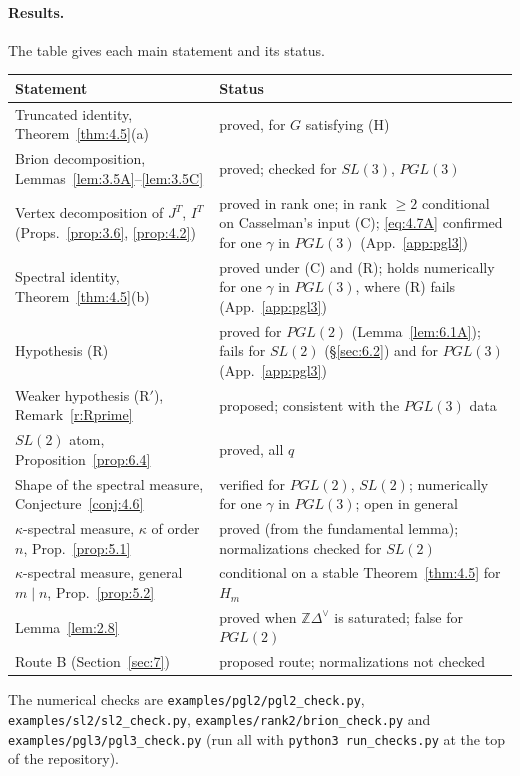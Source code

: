 \documentclass[12pt,letterpaper]{article}
\numberwithin{equation}{section}
\theoremstyle{plain}
\theoremstyle{remark}
\theoremstyle{plain}
\theoremstyle{definition}
\theoremstyle{remark}
\theoremstyle{remark}
\begin{document}
\paragraph{Results.} The table gives each main statement and its status.
\begin{center}
\begin{tabular}{p{}p{}}
\toprule
Statement & Status\\
\midrule
Truncated identity, Theorem~\ref{thm:4.5}(a) & proved, for $G$ satisfying (H)\\
Brion decomposition, Lemmas~\ref{lem:3.5A}--\ref{lem:3.5C} & proved; checked for $SL(3)$, $PGL(3)$\\
Vertex decomposition of $J^T$, $I^T$ (Props.~\ref{prop:3.6}, \ref{prop:4.2}) & proved in rank one; in rank $\ge2$ conditional on Casselman's input (C); \eqref{eq:4.7A} confirmed for one $\gamma$ in $PGL(3)$ (App.~\ref{app:pgl3})\\
Spectral identity, Theorem~\ref{thm:4.5}(b) & proved under (C) and (R); holds numerically for one $\gamma$ in $PGL(3)$, where (R) fails (App.~\ref{app:pgl3})\\
Hypothesis (R) & proved for $PGL(2)$ (Lemma~\ref{lem:6.1A}); fails for $SL(2)$ (\S\ref{sec:6.2}) and for $PGL(3)$ (App.~\ref{app:pgl3})\\
Weaker hypothesis (R$'$), Remark~\ref{r:Rprime} & proposed; consistent with the $PGL(3)$ data\\
$SL(2)$ atom, Proposition~\ref{prop:6.4} & proved, all $q$\\
Shape of the spectral measure, Conjecture~\ref{conj:4.6} & verified for $PGL(2)$, $SL(2)$; numerically for one $\gamma$ in $PGL(3)$; open in general\\
$\kappa$-spectral measure, $\kappa$ of order $n$, Prop.~\ref{prop:5.1} & proved (from the fundamental lemma); normalizations checked for $SL(2)$\\
$\kappa$-spectral measure, general $m\mid n$, Prop.~\ref{prop:5.2} & conditional on a stable Theorem~\ref{thm:4.5} for $H_m$\\
Lemma~\ref{lem:2.8} & proved when $\mathbb{Z}\Delta^\vee$ is saturated; false for $PGL(2)$\\
Route B (Section~\ref{sec:7}) & proposed route; normalizations not checked\\
\bottomrule
\end{tabular}
\end{center}
The numerical checks are \texttt{examples/pgl2/pgl2\_check.py}, \texttt{examples/sl2/sl2\_check.py}, \texttt{examples/rank2/brion\_check.py} and \texttt{examples/pgl3/pgl3\_check.py} (run all with \texttt{python3 run\_checks.py} at the top of the repository).
\end{document}
